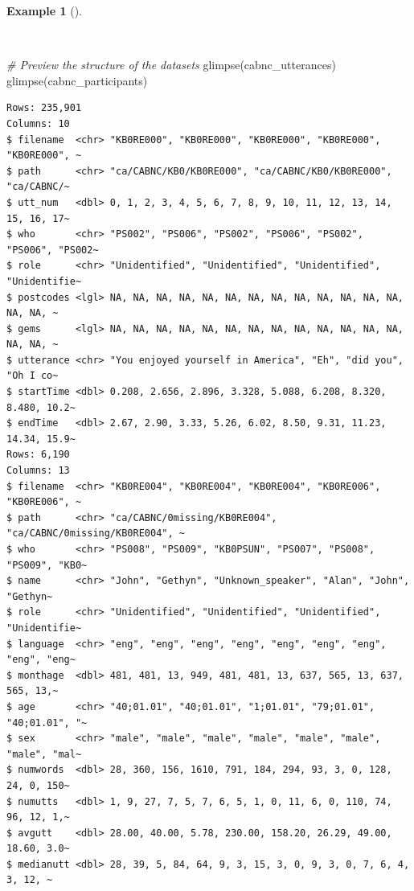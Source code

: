 \documentclass[
  letterpaper,
  krantz1]{latex/krantz-mod}
\newenvironment{Shaded}{\begin{snugshade}}{\end{snugshade}}
\newcommand{\CommentTok}[1]{\textcolor[rgb]{0.00,0.00,0.00}{\textit{#1}}}
\newcommand{\FunctionTok}[1]{\textcolor[rgb]{0.00,0.00,0.00}{#1}}
\newcommand{\NormalTok}[1]{\textcolor[rgb]{0.00,0.00,0.00}{#1}}
\theoremstyle{definition}
\newtheorem{example}{Example}[chapter]
\theoremstyle{definition}
\theoremstyle{remark}
\begin{document}
\begin{example}[]\protect\hypertarget{exm-curate-cabnc-glimpse}{}\label{exm-curate-cabnc-glimpse}

~

\begin{Shaded}
\begin{Highlighting}[numbers=left,,]
\CommentTok{\# Preview the structure of the datasets}
\FunctionTok{glimpse}\NormalTok{(cabnc\_utterances)}
\FunctionTok{glimpse}\NormalTok{(cabnc\_participants)}
\end{Highlighting}
\end{Shaded}

\begin{verbatim}
Rows: 235,901
Columns: 10
$ filename  <chr> "KB0RE000", "KB0RE000", "KB0RE000", "KB0RE000", "KB0RE000", ~
$ path      <chr> "ca/CABNC/KB0/KB0RE000", "ca/CABNC/KB0/KB0RE000", "ca/CABNC/~
$ utt_num   <dbl> 0, 1, 2, 3, 4, 5, 6, 7, 8, 9, 10, 11, 12, 13, 14, 15, 16, 17~
$ who       <chr> "PS002", "PS006", "PS002", "PS006", "PS002", "PS006", "PS002~
$ role      <chr> "Unidentified", "Unidentified", "Unidentified", "Unidentifie~
$ postcodes <lgl> NA, NA, NA, NA, NA, NA, NA, NA, NA, NA, NA, NA, NA, NA, NA, ~
$ gems      <lgl> NA, NA, NA, NA, NA, NA, NA, NA, NA, NA, NA, NA, NA, NA, NA, ~
$ utterance <chr> "You enjoyed yourself in America", "Eh", "did you", "Oh I co~
$ startTime <dbl> 0.208, 2.656, 2.896, 3.328, 5.088, 6.208, 8.320, 8.480, 10.2~
$ endTime   <dbl> 2.67, 2.90, 3.33, 5.26, 6.02, 8.50, 9.31, 11.23, 14.34, 15.9~
Rows: 6,190
Columns: 13
$ filename  <chr> "KB0RE004", "KB0RE004", "KB0RE004", "KB0RE006", "KB0RE006", ~
$ path      <chr> "ca/CABNC/0missing/KB0RE004", "ca/CABNC/0missing/KB0RE004", ~
$ who       <chr> "PS008", "PS009", "KB0PSUN", "PS007", "PS008", "PS009", "KB0~
$ name      <chr> "John", "Gethyn", "Unknown_speaker", "Alan", "John", "Gethyn~
$ role      <chr> "Unidentified", "Unidentified", "Unidentified", "Unidentifie~
$ language  <chr> "eng", "eng", "eng", "eng", "eng", "eng", "eng", "eng", "eng~
$ monthage  <dbl> 481, 481, 13, 949, 481, 481, 13, 637, 565, 13, 637, 565, 13,~
$ age       <chr> "40;01.01", "40;01.01", "1;01.01", "79;01.01", "40;01.01", "~
$ sex       <chr> "male", "male", "male", "male", "male", "male", "male", "mal~
$ numwords  <dbl> 28, 360, 156, 1610, 791, 184, 294, 93, 3, 0, 128, 24, 0, 150~
$ numutts   <dbl> 1, 9, 27, 7, 5, 7, 6, 5, 1, 0, 11, 6, 0, 110, 74, 96, 12, 1,~
$ avgutt    <dbl> 28.00, 40.00, 5.78, 230.00, 158.20, 26.29, 49.00, 18.60, 3.0~
$ medianutt <dbl> 28, 39, 5, 84, 64, 9, 3, 15, 3, 0, 9, 3, 0, 7, 6, 4, 3, 12, ~
\end{verbatim}

\end{example}
\end{document}
